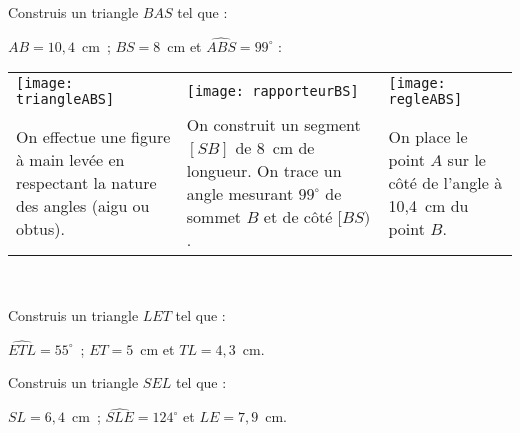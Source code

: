 \begin{methode*1}

 \begin{exemple*1}
Construis un triangle $BAS$ tel que :

$AB = 10,4$ cm ; $BS = 8$ cm et $\widehat{ABS} = 99^\circ$ : \\[1em]
\begin{tabularx}{\textwidth}{X|X|X}
 \texttt{[image: triangleABS]} &  \texttt{[image: rapporteurBS]} & \texttt{[image: regleABS]} \\ 
 On effectue une figure à main levée en respectant la nature des angles (aigu ou obtus). & On construit un segment $[SB]$ de 8 cm de longueur. On trace un angle mesurant $99^\circ$ de sommet $B$ et de côté $[BS)$. & On place le point $A$ sur le côté de l'angle à 10,4 cm du point $B$. \\
\end{tabularx} \\

\end{exemple*1}

\exercice
Construis un triangle $LET$ tel que :

$\widehat{ETL} = 55^\circ$ ; $ET = 5$ cm et $TL = 4,3$ cm.
\vspace{4cm}

\exercice
Construis un triangle $SEL$ tel que :

$SL = 6,4$ cm ; $\widehat{SLE}= 124^\circ$ et $LE = 7,9$ cm.
\vspace{2cm}
 
\end{methode*1}



